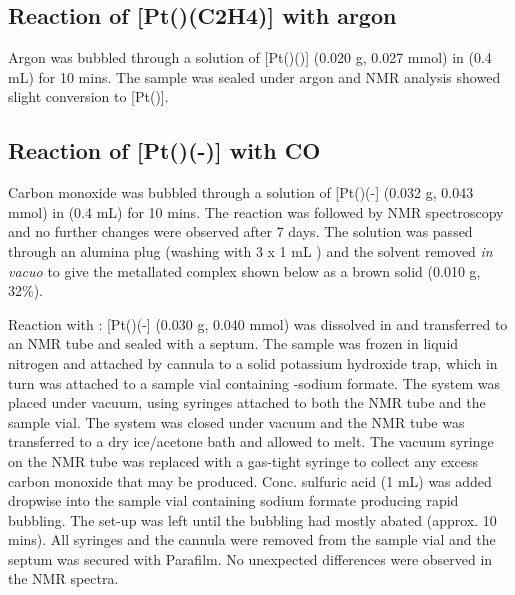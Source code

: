 \subsection*{Reaction of \texorpdfstring{[Pt(\tButhixantphos)(C2H4)]} P with argon}
Argon was bubbled through a solution of [Pt(\tButhixantphos)()] (0.020 g, 0.027 mmol) in  (0.4 mL) for 10 mins.  The sample was sealed under argon and NMR analysis showed slight conversion to [Pt(\tButhixantphos)].  

\subsection*{Reaction of \texorpdfstring{[Pt(\tButhixantphos)(-)]} P with CO}

Carbon monoxide was bubbled through a solution of [Pt(\tButhixantphos)(-] (0.032 g, 0.043 mmol) in  (0.4 mL) for 10 mins.  The reaction was followed by NMR spectroscopy and no further changes were observed after 7 days.  The solution was passed through an alumina plug (washing with 3 x 1 mL ) and the solvent removed \emph{in vacuo} to give the metallated complex shown below as a brown solid (0.010 g, 32\%).  

Reaction with :
[Pt(\tButhixantphos)(-] (0.030 g, 0.040 mmol) was dissolved in  and transferred to an NMR tube and sealed with a septum.  The sample was frozen in liquid nitrogen and attached by cannula to a solid potassium hydroxide trap, which in turn was attached to a sample vial containing \carbon{}-sodium formate.  The system was placed under vacuum, using syringes attached to both the NMR tube and the sample vial.  The system was closed under vacuum and the NMR tube was transferred to a dry ice/acetone bath and allowed to melt.  The vacuum syringe on the NMR tube was replaced with a gas-tight syringe to collect any excess carbon monoxide that may be produced.  Conc. sulfuric acid (1 mL) was added dropwise into the sample vial containing sodium formate producing rapid bubbling.  The set-up was left until the bubbling had mostly abated (approx. 10 mins).  All syringes and the cannula were removed from the sample vial and the septum was secured with Parafilm.  No unexpected differences were observed in the NMR spectra.  


